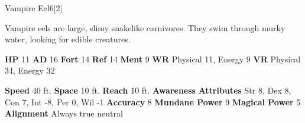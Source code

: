   \begin{monsection}{Vampire Eel}{6}[2]
    \vspace{-1em}\vspace{-1em}
    \vspace{0em}

    
      Vampire eels are large, slimy snakelike carnivores.
      They swim through murky water, looking for edible creatures.
    
    

    \begin{spellcontent}
      \begin{spelltargetinginfo}
        \pari \textbf{HP} 11 \monsep
          \textbf{AD} 16 \monsep
          \textbf{Fort} 14 \monsep
          \textbf{Ref} 14 \monsep
          \textbf{Ment} 9
        \pari \textbf{WR} Physical 11, Energy 9 \monsep
        \textbf{VR} Physical 34, Energy 32
        
      \end{spelltargetinginfo}
    \end{spellcontent}
    \begin{monsterfooter}
      \pari \textbf{Speed} 40 ft. \monsep
        \textbf{Space} 10 ft. \monsep
        \textbf{Reach} 10 ft.
      \pari \textbf{Awareness} 
      \pari \textbf{Attributes}
        Str 8, Dex 8,
        Con 7, Int -8,
        Per 0, Wil -1
      \pari \textbf{Accuracy} 8 \monsep
        \textbf{Mundane Power} 9 \monsep
      \textbf{Magical Power} 5
      \pari \textbf{Alignment} Always true neutral
    \end{monsterfooter}
  \end{monsection}
  
